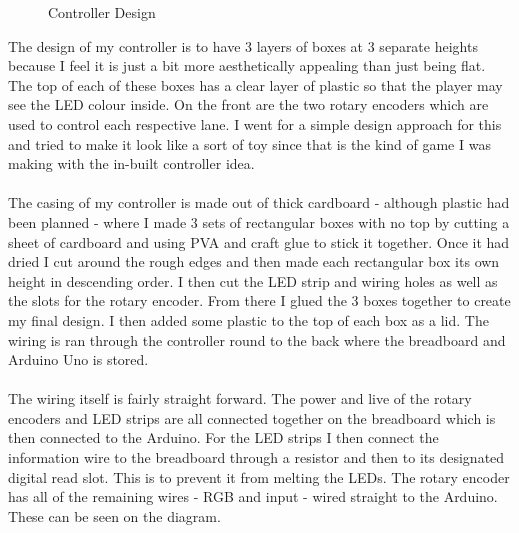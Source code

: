 \documentclass{article}
\begin{document}
\begin{figure}[ht]%
    \centering
    \qquad
    \qquad
    \caption{Controller Design}%
    \label{fig:controller-design}%
\end{figure}

The design of my controller is to have 3 layers of boxes at 3 separate heights because I feel it is just a bit more aesthetically appealing than just being flat. The top of each of these boxes has a clear layer of plastic so that the player may see the LED colour inside. On the front are the two rotary encoders which are used to control each respective lane. I went for a simple design approach for this and tried to make it look like a sort of toy since that is the kind of game I was making with the in-built controller idea.
\\
\\
The casing of my controller is made out of thick cardboard - although plastic had been planned - where I made 3 sets of rectangular boxes with no top by cutting a sheet of cardboard and using PVA and craft glue to stick it together. Once it had dried I cut around the rough edges and then made each rectangular box its own height in descending order. I then cut the LED strip and wiring holes as well as the slots for the rotary encoder. From there I glued the 3 boxes together to create my final design. I then added some plastic to the top of each box as a lid. The wiring is ran through the controller round to the back where the breadboard and Arduino Uno is stored.
\\
\\
The wiring itself is fairly straight forward. The power and live of the rotary encoders and LED strips are all connected together on the breadboard which is then connected to the Arduino. For the LED strips I then connect the information wire to the breadboard through a resistor and then to its designated digital read slot. This is to prevent it from melting the LEDs. The rotary encoder has all of the remaining wires - RGB and input - wired straight to the Arduino. These can be seen on the diagram.
\end{document}
